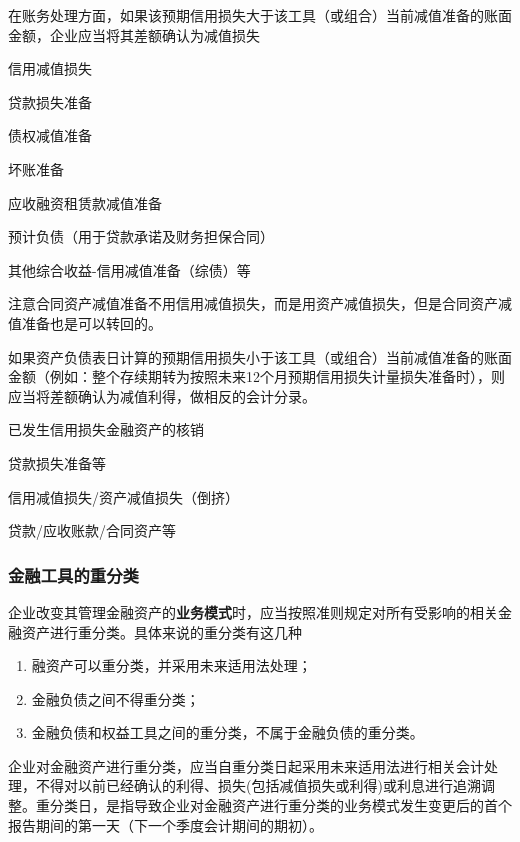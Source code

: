 \documentclass[UTF8,12pt]{ctexart}
\newenvironment{Dr}{%
	\begin{list}{}%
		{
			\setlength{\leftmargin}{2em}
			\setlength{\labelwidth}{2em}
			\setlength{\labelsep}{0pt}
			\setlength{\itemindent}{0pt}
			\setlength{\listparindent}{0pt}
			\setlength{\parsep}{0pt}
			\setlength{\topsep}{0pt}
		}
		\item[\textbf{借：}]
	}{%
	\end{list}
}
\newenvironment{Cr}{%
	\begin{list}{}%
		{
			\setlength{\leftmargin}{3em}
			\setlength{\labelwidth}{2em}
			\setlength{\labelsep}{0pt}
			\setlength{\itemindent}{0pt}
			\setlength{\listparindent}{0pt}
			\setlength{\parsep}{0pt}
			\setlength{\topsep}{0pt}
		}
		\item[\textbf{贷：}]
	}{%
	\end{list}
}
\numberwithin{equation}{section} %
\numberwithin{figure}{section}
\numberwithin{table}{section}
\begin{document}
	在账务处理方面，如果该预期信用损失大于该工具（或组合）当前减值准备的账面金额，企业应当将其差额确认为减值损失
	
	\begin{Dr}
		信用减值损失
	\end{Dr}
	\begin{Cr}
		贷款损失准备
		
		债权减值准备
		
		坏账准备
		
		应收融资租赁款减值准备
		
		预计负债（用于贷款承诺及财务担保合同）
		
		其他综合收益-信用减值准备（综债）等
	\end{Cr}

	注意合同资产减值准备不用信用减值损失，而是用资产减值损失，但是合同资产减值准备也是可以转回的。
	
	如果资产负债表日计算的预期信用损失小于该工具（或组合）当前减值准备的账面金额（例如：整个存续期转为按照未来12个月预期信用损失计量损失准备时），则应当将差额确认为减值利得，做相反的会计分录。
	
	已发生信用损失金融资产的核销
	\begin{Dr}
		贷款损失准备等
		
		信用减值损失/资产减值损失（倒挤）
	\end{Dr}
	\begin{Cr}
		贷款/应收账款/合同资产等
	\end{Cr}
	
	
	\subsubsection{金融工具的重分类}
	企业改变其管理金融资产的\textbf{业务模式}时，应当按照准则规定对所有受影响的相关金融资产进行重分类。具体来说的重分类有这几种
	\begin{enumerate}
		\item 融资产可以重分类，并采用未来适用法处理；
		
		\item 金融负债之间不得重分类；
		
		\item 金融负债和权益工具之间的重分类，不属于金融负债的重分类。
	\end{enumerate}
	
	企业对金融资产进行重分类，应当自重分类日起采用未来适用法进行相关会计处理，不得对以前已经确认的利得、损失(包括减值损失或利得)或利息进行追溯调整。重分类日，是指导致企业对金融资产进行重分类的业务模式发生变更后的首个报告期间的第一天（下一个季度会计期间的期初）。
\end{document}
